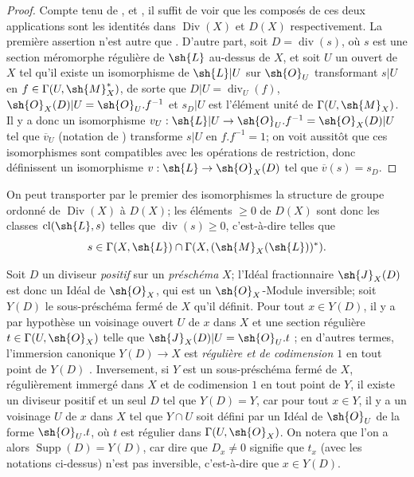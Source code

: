 \begin{proof}
Compte tenu de ,  et , il suffit de voir que les composés de ces deux applications sont les identités dans $\operatorname{Div}(X)$ et $D(X)$ respectivement.
La première assertion n'est autre que .
D'autre part, soit $D=\operatorname{div}(s)$, où $s$ est une section méromorphe régulière de $\sh{L}$ au-dessus de $X$, et soit $U$ un ouvert de $X$ tel qu'il existe un isomorphisme de $\sh{L}|U$ sur $\sh{O}_U$ transformant $s|U$ en $f\in\Gamma(U,\sh{M}_X^*)$, de sorte que $D|U=\operatorname{div}_U(f)$, $\sh{O}_X(D)|U=\sh{O}_U.f^{-1}$ et $s_D|U$ est l'élément unité de $\Gamma(U,\sh{M}_X)$.
Il y a donc un isomorphisme $v_U:\sh{L}|U\to\sh{O}_U.f^{-1}=\sh{O}_X(D)|U$ tel que $\overline{v}_U$ (notation de ) transforme $s|U$ en $f.f^{-1}=1$;
on voit aussitôt que ces isomorphismes sont compatibles avec les opérations de restriction, donc définissent un isomorphisme $v:\sh{L}\to\sh{O}_X(D)$ tel que $\overline{v}(s)=s_D$.
\end{proof}

On peut transporter par le premier des isomorphismes  la structure de groupe ordonné de $\operatorname{Div}(X)$ à $D(X)$;
les éléments $\geq0$ de $D(X)$ sont donc les classes $\operatorname{cl}(\sh{L},s)$ telles que $\operatorname{div}(s)\geq0$, c'est-à-dire  telles que
\[
  s\in\Gamma(X,\sh{L})\cap\Gamma(X,(\sh{M}_X(\sh{L}))^*).
\]

\begin{env}[21.2.12]
\label{IV.21.2.12}
Soit $D$ un diviseur \emph{positif} sur un \emph{préschéma} $X$;
l'Idéal fractionnaire $\sh{J}_X(D)$ est donc un Idéal de $\sh{O}_X$, qui est un $\sh{O}_X$-Module inversible;
soit $Y(D)$ le sous-préschéma fermé de $X$ qu'il définit.
Pour tout $x\in Y(D)$, il y a par hypothèse un voisinage ouvert $U$ de $x$ dans $X$ et une section régulière $t\in\Gamma(U,\sh{O}_X)$ telle que $\sh{J}_X(D)|U=\sh{O}_U.t$ ;
en d'autres termes, l'immersion canonique $Y(D)\to X$ est \emph{régulière et de codimension $1$} en tout point de $Y(D)$ .
Inversement, si $Y$ est un sous-préschéma fermé de $X$, régulièrement immergé dans $X$ et de codimension $1$ en tout point de $Y$, il existe un diviseur positif et un seul $D$ tel que $Y(D)=Y$, car pour tout $x\in Y$, il y a un voisinage $U$ de $x$ dans $X$ tel que $Y\cap U$ soit défini par un Idéal de $\sh{O}_U$ de la forme $\sh{O}_U.t$, où $t$ est régulier dans $\Gamma(U,\sh{O}_X)$.
On notera que l'on a alors $\operatorname{Supp}(D)=Y(D)$, car dire que $D_x\neq0$ signifie que $t_x$ (avec les notations ci-dessus) n'est pas inversible, c'est-à-dire que $x\in Y(D)$.
\end{env}

